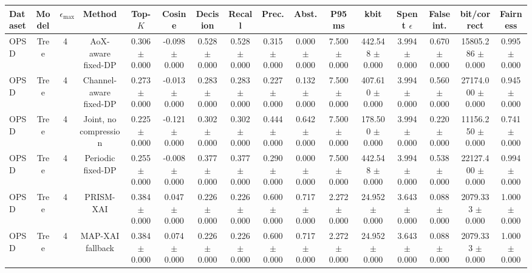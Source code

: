 \begin{tabular}{lccccccccccccccc}
\toprule
Dataset & Model & $\epsilon_{\max}$ & Method & Top-$K$ & Cosine & Decision & Recall & Prec. & Abst. & P95 ms & kbit & Spent $\epsilon$ & False int. & bit/correct & Fairness \\
\midrule
OPSD & Tree & 4 & AoX-aware fixed-DP & 0.306 $\pm$ 0.000 & -0.098 $\pm$ 0.000 & 0.528 $\pm$ 0.000 & 0.528 $\pm$ 0.000 & 0.315 $\pm$ 0.000 & 0.000 $\pm$ 0.000 & 7.500 $\pm$ 0.000 & 442.548 $\pm$ 0.000 & 3.994 $\pm$ 0.000 & 0.670 $\pm$ 0.000 & 15805.286 $\pm$ 0.000 & 0.995 $\pm$ 0.000 \\
OPSD & Tree & 4 & Channel-aware fixed-DP & 0.273 $\pm$ 0.000 & -0.013 $\pm$ 0.000 & 0.283 $\pm$ 0.000 & 0.283 $\pm$ 0.000 & 0.227 $\pm$ 0.000 & 0.132 $\pm$ 0.000 & 7.500 $\pm$ 0.000 & 407.610 $\pm$ 0.000 & 3.994 $\pm$ 0.000 & 0.560 $\pm$ 0.000 & 27174.000 $\pm$ 0.000 & 0.945 $\pm$ 0.000 \\
OPSD & Tree & 4 & Joint, no compression & 0.225 $\pm$ 0.000 & -0.121 $\pm$ 0.000 & 0.302 $\pm$ 0.000 & 0.302 $\pm$ 0.000 & 0.444 $\pm$ 0.000 & 0.642 $\pm$ 0.000 & 7.500 $\pm$ 0.000 & 178.500 $\pm$ 0.000 & 3.994 $\pm$ 0.000 & 0.220 $\pm$ 0.000 & 11156.250 $\pm$ 0.000 & 0.741 $\pm$ 0.000 \\
OPSD & Tree & 4 & Periodic fixed-DP & 0.255 $\pm$ 0.000 & -0.008 $\pm$ 0.000 & 0.377 $\pm$ 0.000 & 0.377 $\pm$ 0.000 & 0.290 $\pm$ 0.000 & 0.000 $\pm$ 0.000 & 7.500 $\pm$ 0.000 & 442.548 $\pm$ 0.000 & 3.994 $\pm$ 0.000 & 0.538 $\pm$ 0.000 & 22127.400 $\pm$ 0.000 & 0.994 $\pm$ 0.000 \\
OPSD & Tree & 4 & PRISM-XAI & 0.384 $\pm$ 0.000 & 0.047 $\pm$ 0.000 & 0.226 $\pm$ 0.000 & 0.226 $\pm$ 0.000 & 0.600 $\pm$ 0.000 & 0.717 $\pm$ 0.000 & 2.272 $\pm$ 0.000 & 24.952 $\pm$ 0.000 & 3.643 $\pm$ 0.000 & 0.088 $\pm$ 0.000 & 2079.333 $\pm$ 0.000 & 1.000 $\pm$ 0.000 \\
OPSD & Tree & 4 & MAP-XAI fallback & 0.384 $\pm$ 0.000 & 0.074 $\pm$ 0.000 & 0.226 $\pm$ 0.000 & 0.226 $\pm$ 0.000 & 0.600 $\pm$ 0.000 & 0.717 $\pm$ 0.000 & 2.272 $\pm$ 0.000 & 24.952 $\pm$ 0.000 & 3.643 $\pm$ 0.000 & 0.088 $\pm$ 0.000 & 2079.333 $\pm$ 0.000 & 1.000 $\pm$ 0.000 \\
\bottomrule
\end{tabular}
